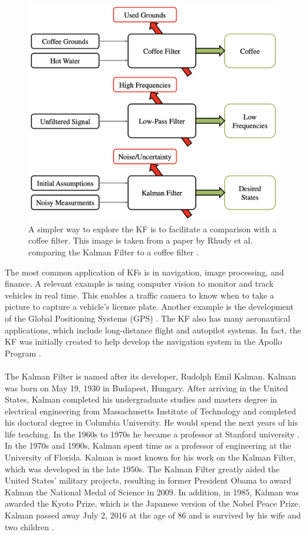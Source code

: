 \begin{figure}[h]
    \centering
    \includegraphics[scale = 0.4]{coffee.png}
    \caption{A simpler way to explore the KF is to facilitate a comparison with a coffee filter. This image is taken from a paper by Rhudy et al. comparing the Kalman Filter to a coffee filter \cite{article7}.}
    \end{figure}

\newpage

\noindent The most common application of KFs is in navigation, image processing, and finance. A relevant example is using computer vision to monitor and track vehicles in real time. This enables a traffic camera to know when to take a picture to capture a vehicle's license plate. Another example is the development of the Global Positioning Systems (GPS) \cite{lim_ong_lim_koo_2016}. The KF also has many aeronautical applications, which include long-distance flight and autopilot systems. In fact, the KF was initially created to help develop the navigation system in the Apollo Program \cite{kalmanbio}.  \\ \\


\noindent The Kalman Filter is named after its developer, Rudolph Emil Kalman. Kalman was born on May 19, 1930 in Budapest, Hungary. After arriving in the United States, Kalman completed his undergraduate studies and masters degree in electrical engineering from Massachusetts Institute of Technology and completed his doctoral degree in Columbia University. He would spend the next years of his life teaching. In the 1960s to 1970s he became a professor at Stanford university \cite{kalmanbio}. In the 1970s and 1990s, Kalman spent time as a professor of engineering at the University of Florida. Kalman is most known for his work on the Kalman Filter, which was developed in the late 1950s. The Kalman Filter greatly aided the United States' military projects, resulting in former President Obama to award Kalman the National Medal of Science in 2009. In addition, in 1985, Kalman was awarded the Kyoto Prize, which is the Japanese version of the Nobel Peace Prize. Kalman passed away July 2, 2016 at the age of 86 and is survived by his wife and two children \cite{Kalman_bio}. 


